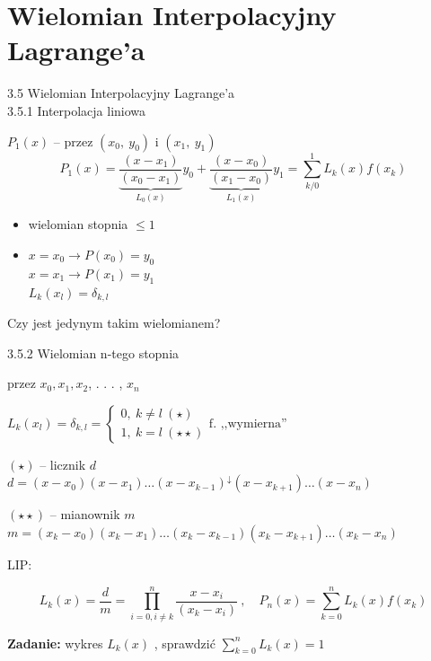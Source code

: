 \section{Wielomian Interpolacyjny Lagrange'a}

\begin{frame}{3.5 Wielomian Interpolacyjny Lagrange'a \\ 3.5.1 Interpolacja liniowa}


$P_{1}(x)$ -- przez $(x_{0},\ y_{0})$ i $(x_{1},\ y_{1})$
$$
P_{1}(x)=\underbrace{\frac{(x-x_{1})}{(x_{0}-x_{1})}}_{L_0(x)}y_{0}+\underbrace{\frac{(x-x_{0})}{(x_{1}-x_{0})}}_{L_1(x)}y_{1}=\sum_{k/0}^{1}L_{k}(x)f(x_{k})
$$
\begin{itemize}
\item wielomian stopnia $\leq 1$

\item $x=x_{0}\rightarrow P(x_{0})=y_{0}$ \\
$x=x_{1}\rightarrow P(x_{1})=y_{1}$ \\
$L_{k}(x_{l})=\delta_{k,l}$ \\
\end{itemize}
\begin{flushright}Czy jest jedynym takim wielomianem?\end{flushright}

\end{frame}


\begin{frame}{3.5.2 Wielomian $\mathrm{n}$-tego stopnia}


przez $x_{0}, x_{1}, x_{2}$, . . . , $x_{n}$

$L_{k}(x_{l})=\delta_{k,l}=\left\{\begin{array}{l}
0,\ k\neq l\ (\star)\ \\
1,\ k=l\ (\star\star)
\end{array}\right. \text{f. ,,wymierna''} $

$(\star)$ -- licznik $d$
$d=(x-x_{0})(x-x_{1})\ldots(x-x_{k-1})^{\downarrow}(x-x_{k+1})\ldots(x-x_{n})$

$(\star\star)$ -- mianownik $m$
$m=(x_{k}-x_{0})(x_{k}-x_{1})\ldots(x_{k}-x_{k-1})(x_{k}-x_{k+1})\ldots(x_{k}-x_{n})$

LIP:

$$L_{k}(x) = \frac{d}{m} = \prod_{i=0,i\neq k}^{n}\frac{x-x_{i}}{(x_{k}-x_{i})}\ , \quad P_{n}(x)=\sum_{k=0}^{n}L_{k}(x)f(x_{k})$$

\textbf{Zadanie:} wykres $L_{k}(x)$ , sprawdzić $\displaystyle \sum_{k=0}^{n}L_{k}(x)=1$
\end{frame}


